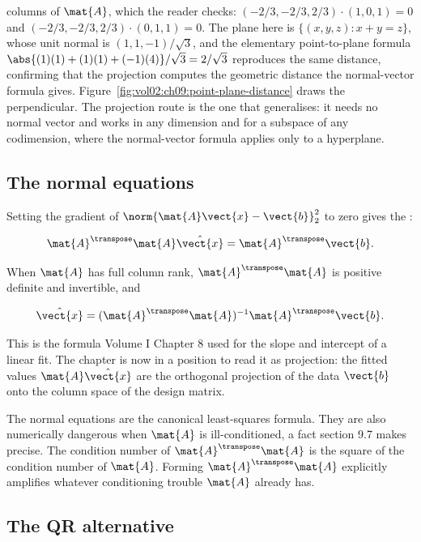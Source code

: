 \begin{example}
columns of $\mat{A}$, which the reader checks: $(-2/3, -2/3, 2/3) \cdot
(1, 0, 1) = 0$ and $(-2/3, -2/3, 2/3) \cdot (0, 1, 1) = 0$. The plane
here is $\{(x, y, z) : x + y = z\}$, whose unit normal is $(1, 1, -1)/
\sqrt{3}$, and the elementary point-to-plane formula $\abs{(1)(1) +
(1)(1) + (-1)(4)}/\sqrt{3} = 2/\sqrt{3}$ reproduces the same distance,
confirming that the projection computes the geometric distance the
normal-vector formula gives. Figure~\ref{fig:vol02:ch09:point-plane-distance}
draws the perpendicular. The projection route is the one that
generalises: it needs no normal vector and works in any dimension and
for a subspace of any codimension, where the normal-vector formula
applies only to a hyperplane.
\end{example}



\subsection{The normal equations}

Setting the gradient of $\norm{\mat{A}\vect{x} - \vect{b}}_{2}^{2}$
to zero gives the :

\[
\mat{A}^{\transpose}\mat{A}\hat{\vect{x}} = \mat{A}^{\transpose}\vect{b}.
\]

When $\mat{A}$ has full column rank, $\mat{A}^{\transpose}\mat{A}$
is positive definite and invertible, and

\[
\hat{\vect{x}} = (\mat{A}^{\transpose}\mat{A})^{-1}
\mat{A}^{\transpose}\vect{b}.
\]

This is the formula Volume I Chapter 8 used for the slope and
intercept of a linear fit. The chapter is now in a position to read
it as projection: the fitted values $\mat{A}\hat{\vect{x}}$ are the
orthogonal projection of the data $\vect{b}$ onto the column space
of the design matrix.

The normal equations are the canonical least-squares formula. They
are also numerically dangerous when $\mat{A}$ is ill-conditioned, a
fact section 9.7 makes precise. The condition number of
$\mat{A}^{\transpose}\mat{A}$ is the square of the condition number
of $\mat{A}$. Forming $\mat{A}^{\transpose}\mat{A}$ explicitly
amplifies whatever conditioning trouble $\mat{A}$ already has.

\subsection{The QR alternative}

